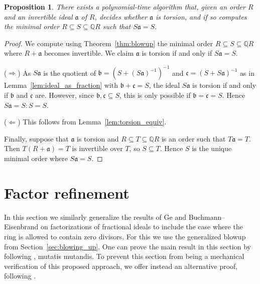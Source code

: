 \documentclass{amsart}
\theoremstyle{plain}
\newtheorem{proposition}[theorem]{Proposition}
\theoremstyle{definition}
\newcommand{\Q}{\ensuremath{\mathbb{Q}}}
\begin{document}
\begin{proposition}\label{prop:torsion}
There exists a polynomial-time algorithm that, given an order \(R\) and an invertible ideal \(\mathfrak{a}\) of \(R\), decides whether \(\mathfrak{a}\) is torsion, and if so computes the minimal order \(R\subseteq S\subseteq\Q R\) such that \(S\mathfrak{a}=S\).
\end{proposition}
\begin{proof}
We compute using Theorem~\ref{thm:blowup} the minimal order \(R\subseteq S\subseteq\Q R\) where \(R+\mathfrak{a}\) becomes invertible. We claim \(\mathfrak{a}\) is torsion if and only if \(S\mathfrak{a}=S\).

(\(\Rightarrow\)) %
As \(S\mathfrak{a}\) is the quotient of \(\mathfrak{b}=(S+(S\mathfrak{a})^{-1})^{-1}\) and \(\mathfrak{c}=(S+S\mathfrak{a})^{-1}\) as in Lemma~\ref{lem:ideal_as_fraction} with \(\mathfrak{b}+\mathfrak{c}=S\), the ideal \(S\mathfrak{a}\) is torsion if and only if \(\mathfrak{b}\) and \(\mathfrak{c}\) are.
However, since \(\mathfrak{b},\mathfrak{c}\subseteq S\), this is only possible if \(\mathfrak{b}=\mathfrak{c}=S\). 
Hence \(S\mathfrak{a}=S : S=S\).

(\(\Leftarrow\))
This follows from Lemma~\ref{lem:torsion_equiv}.

Finally, suppose that \(\mathfrak{a}\) is torsion and \(R\subseteq T\subseteq\Q R\) is an order such that \(T\mathfrak{a}=T\). Then \(T(R+\mathfrak{a})=T\) is invertible over \(T\), so \(S\subseteq T\). Hence \(S\) is the unique minimal order where \(S\mathfrak{a}=S\).
\end{proof}

\section{Factor refinement}\label{sec:factor_refinement}

In this section we similarly generalize the results of Ge \cite{Ge} and Buchmann--Eisenbrand \cite{Buchmann-Eisenbrand} on factorizations of fractional ideals to include the case where the ring is allowed to contain zero divisors.
For this we use the generalized blowup from Section~\ref{sec:blowing_up}.
One can prove the main result in this section by following \cite{Buchmann-Eisenbrand}, mutatis mutandis.
To prevent this section from being a mechanical verification of this proposed approach, we offer instead an alternative proof, following \cite{thesis}.
\end{document}

